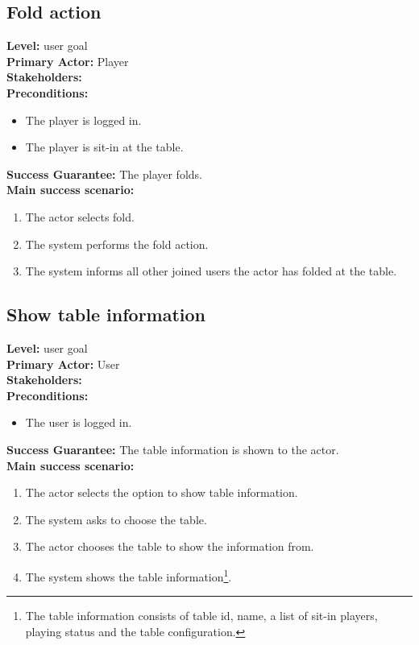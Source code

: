 \documentclass[a4paper,11pt]{report}
\begin{document}
\subsection{Fold action}
\textbf{Level:} user goal \\
\textbf{Primary Actor:} Player \\
\textbf{Stakeholders:} \\
\textbf{Preconditions:}
\begin{itemize}
\item The player is logged in.
\item The player is sit-in at the table.
\end{itemize}
\textbf{Success Guarantee:} The player folds. \\
\textbf{Main success scenario:} 
\begin{enumerate}
\item The actor selects fold.
\item The system performs the fold action. 
\item The system informs all other joined users the actor has folded at the table.
\end{enumerate}

\subsection{Show table information}
\textbf{Level:} user goal \\
\textbf{Primary Actor:} User \\
\textbf{Stakeholders:} \\
\textbf{Preconditions:}
\begin{itemize}
\item The user is logged in.
\end{itemize}
\textbf{Success Guarantee:} The table information is shown to the actor. \\
\textbf{Main success scenario:} 
\begin{enumerate}
\item The actor selects the option to show table information. 
\item The system asks to choose the table. 
\item The actor chooses the table to show the information from.
\item The system shows the table information\footnote{The table information consists of table id, name, a list of sit-in players, playing status and the table configuration.}. 
\end{enumerate}
\end{document}
